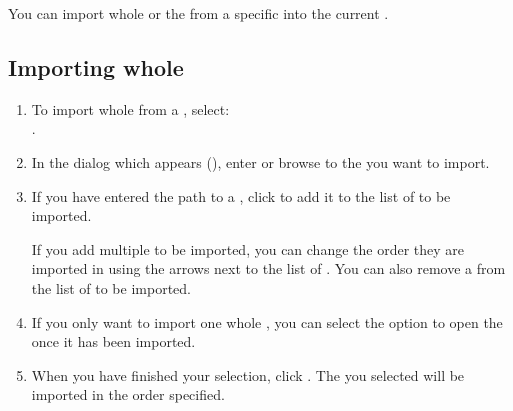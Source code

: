 
You can import whole \gdprojects{}  or the \gdcases{}  from a specific \gdproject{} into the current \gdproject{}. 

\subsection{Importing whole \gdprojects{}}
\label{ImportProject}

\begin{enumerate} 
\item To import whole \gdprojects{} from a \gdproject{}, select:\\
 . 
\item In the dialog which appears (), enter or browse to the \gdproject{} you want to import. 

\item If you have entered the path to a \gdproject{}, click  to add it to the list of \gdprojects{} to be imported. 


If you add multiple \gdprojects{} to be imported, you can change the order they are imported in using the arrows next to the list of \gdprojects{}. You can also remove a \gdproject{} from the list of \gdprojects{} to be imported. 

\item If you only want to import one whole \gdproject{}, you can select the option to open the \gdproject{} once it has been imported. 

\item When you have finished your selection, click . The \gdprojects{} you selected will be imported in the order specified. 
\end{enumerate}

